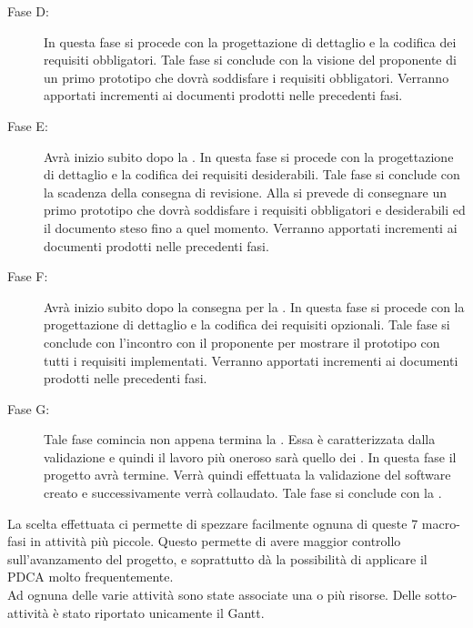 \begin{description}
			\item[Fase D:] In questa fase si procede con la progettazione di dettaglio e la codifica dei requisiti obbligatori. Tale fase si conclude con la visione del proponente di un primo prototipo che dovrà soddisfare i requisiti obbligatori. Verranno apportati incrementi ai documenti prodotti nelle precedenti fasi.
			\item[Fase E:] Avrà inizio subito dopo la . In questa fase si procede con la progettazione di dettaglio e la codifica dei requisiti desiderabili. Tale fase si conclude con la scadenza della consegna di revisione. Alla  si prevede di consegnare un primo prototipo che dovrà soddisfare i requisiti obbligatori e desiderabili ed il documento  steso fino a quel momento. Verranno apportati incrementi ai documenti prodotti nelle precedenti fasi.
			\item[Fase F:] Avrà inizio subito dopo la consegna per la . In questa fase si procede con la progettazione di dettaglio e la codifica dei requisiti opzionali. Tale fase si conclude con l'incontro con il proponente per mostrare il prototipo con tutti i requisiti implementati. Verranno apportati incrementi ai documenti prodotti nelle precedenti fasi.
			\item[Fase G:] Tale fase comincia non appena termina la . Essa è caratterizzata dalla validazione e quindi il lavoro più oneroso sarà quello dei . In questa fase il progetto avrà termine. Verrà quindi effettuata la validazione del software creato e successivamente verrà collaudato. Tale fase si conclude con la .
		\end{description}
		La scelta effettuata ci permette di spezzare facilmente ognuna di queste 7 macro-fasi in attività più piccole. Questo permette di avere maggior controllo sull'avanzamento del progetto, e soprattutto dà la possibilità di applicare il PDCA molto frequentemente.\\Ad ognuna delle varie attività sono state associate una o più risorse. Delle sotto-attività è stato riportato unicamente il Gantt.

